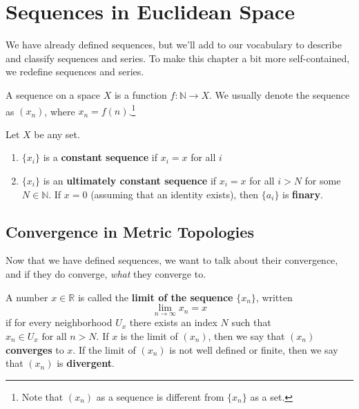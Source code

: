\section{Sequences in Euclidean Space} 

  We have already defined sequences, but we'll add to our vocabulary to describe and classify sequences and series. To make this chapter a bit more self-contained, we redefine sequences and series. 

  \begin{definition}[Sequence]
    A sequence on a space $X$ is a function $f: \mathbb{N} \rightarrow X$. We usually denote the sequence as $(x_n)$, where $x_n = f(n)$.\footnote{Note that $(x_n)$ as a sequence is different from $\{x_n\}$ as a set.} 
  \end{definition}

  \begin{definition}
    Let $X$ be any set. 
    \begin{enumerate}
      \item $\{x_i\}$ is a \textbf{constant sequence} if $x_i = x$ for all $i$
      \item $\{x_i\}$ is an \textbf{ultimately constant sequence} if $x_i = x$ for all $i > N$ for some $N \in \mathbb{N}$. If $x = 0$ (assuming that an identity exists), then $\{a_i\}$ is \textbf{finary}.
    \end{enumerate}
  \end{definition}

\subsection{Convergence in Metric Topologies}

  Now that we have defined sequences, we want to talk about their convergence, and if they do converge, \textit{what} they converge to. 

  \begin{definition}
    A number $x \in \mathbb{R}$ is called the \textbf{limit of the sequence} $\{x_n\}$, written 
    \begin{equation}
      \lim_{n \rightarrow \infty} x_n = x
    \end{equation}
    if for every neighborhood $U_x$ there exists an index $N$ such that $x_n \in U_x \text{ for all } n > N$. If $x$ is the limit of $(x_n)$, then we say that $(x_n)$ \textbf{converges} to $x$. If the limit of $(x_n)$ is not well defined or finite, then we say that $(x_n)$ is \textbf{divergent}. 
  \end{definition}

